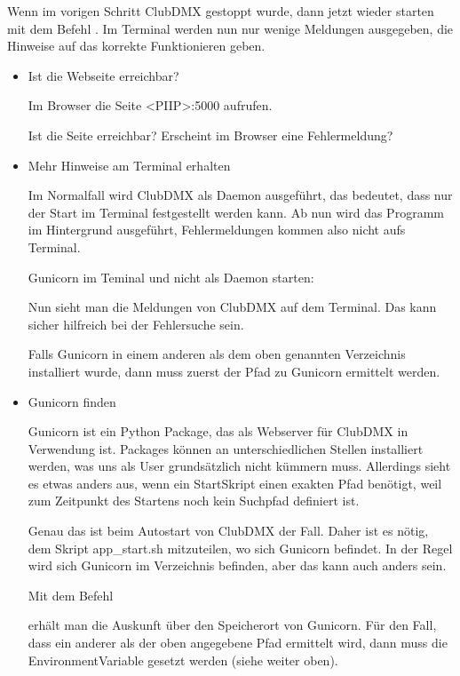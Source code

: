 \documentclass[letterpaper,10pt,ngerman]{sphinxmanual}
\begin{document}
Wenn im vorigen Schritt ClubDMX gestoppt wurde, dann jetzt wieder starten mit
dem Befehl  . Im Terminal werden nun nur wenige Meldungen
ausgegeben, die Hinweise auf das korrekte Funktionieren geben.
\begin{itemize}
\item {} 
Ist die Webseite erreichbar?

Im Browser die Seite \textless{}PI\sphinxhyphen{}IP\textgreater{}:5000 aufrufen.

Ist die Seite erreichbar? Erscheint im Browser eine Fehlermeldung?

\item {} 
Mehr Hinweise am Terminal erhalten

Im Normalfall wird ClubDMX als Daemon ausgeführt, das bedeutet, dass nur der
Start im Terminal festgestellt werden kann. Ab nun wird das Programm im
Hintergrund ausgeführt, Fehlermeldungen kommen also nicht aufs Terminal.

Gunicorn im Teminal und nicht als Daemon starten:

\begin{sphinxVerbatim}[commandchars=\\\{\}]
 
 
 
\end{sphinxVerbatim}

Nun sieht man die Meldungen von ClubDMX auf dem Terminal. Das kann sicher
hilfreich bei der Fehlersuche sein.

Falls Gunicorn in einem anderen als dem oben genannten Verzeichnis
installiert wurde, dann muss zuerst der Pfad zu Gunicorn ermittelt werden.

\item {} 
Gunicorn finden

Gunicorn ist ein Python Package, das als Webserver für ClubDMX in Verwendung ist.
Packages können an unterschiedlichen Stellen installiert werden, was uns als User
grundsätzlich nicht kümmern muss. Allerdings sieht es etwas anders aus, wenn ein
Start\sphinxhyphen{}Skript einen exakten Pfad benötigt, weil zum Zeitpunkt des Startens noch kein
Suchpfad definiert ist.

Genau das ist beim Autostart von ClubDMX der Fall. Daher ist es nötig, dem Skript
app\_start.sh mitzuteilen, wo sich Gunicorn befindet. In der Regel wird sich
Gunicorn im Verzeichnis  befinden, aber das kann auch anders sein.

Mit dem Befehl


erhält man die Auskunft über den Speicherort von Gunicorn. Für den Fall, dass
ein anderer als der oben angegebene Pfad ermittelt wird, dann muss
die Environment\sphinxhyphen{}Variable  gesetzt werden (siehe
 weiter oben).

\end{itemize}
\end{document}
